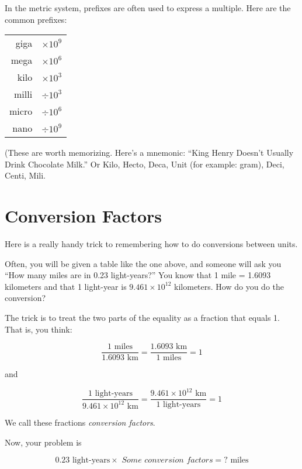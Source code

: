 In the metric system, prefixes are often used to express a multiple. Here are the common prefixes:

\begin{mdframed}[style=important, frametitle={Common Prefixes for Metric Units}]

\begin{tabular}{r | l}
giga  & $\times 10^{9}$\\
mega  & $\times 10^{6}$\\
kilo  & $\times 10^{3}$\\
milli  & $\div 10^{3}$\\
micro  & $\div 10^{6}$\\
nano  & $\div 10^{9}$\\
\end{tabular}

(These are worth memorizing. Here's a mnemonic: ``King Henry Doesn't Usually Drink Chocolate Milk.'' Or Kilo, Hecto, Deca, Unit (for example: gram), Deci, Centi, Mili.
\end{mdframed}

\section{Conversion Factors}

Here is a really handy trick to remembering how to do conversions
between units.

Often, you will be given a table like the one above, and someone will ask you
``How many miles are in 0.23 light-years?''  You know that 1 mile = 1.6093
kilometers and that 1 light-year is $9.461 \times 10^{12}$ kilometers.
How do you do the conversion?

The trick is to treat the two parts of the equality as a fraction that equals 1.  That is, you think:

$$\frac{1 \text{ miles}}{1.6093 \text{ km}} = \frac{1.6093 \text{ km}}{1 \text{ miles}} = 1$$

and

$$\frac{1 \text{ light-years}}{9.461 \times 10^{12} \text{ km}} = \frac{9.461 \times 10^{12} \text{ km}}{1 \text{ light-years}} = 1$$

We call these fractions \textit{conversion factors}.

Now, your problem is

$$0.23 \text{ light-years} \times \textit{ Some conversion factors} = ? \text{ miles}$$

